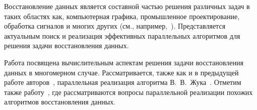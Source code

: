 


Восстановление
данных является составной частью решения различных 
задач в таких областях как, компьютерная графика,
промышленное проектирование,
обработка сигналов и многих других
(см., например,~\cite{book_Kvasov, paper_recv_1, paper_recv_3}).
Представляется актуальным поиск и реализация эффективных параллельных алгоритмов
для решения задачи восстановления данных.

Работа посвящена 
вычислительным аспектам 
решения задачи восстановления данных в многомерном случае. 
Рассматривается, также как и в предыдущей работе авторов~\cite{my_paper_LETI_21},
параллельная реализация
алгоритма
В.~В.~Жука~\cite{book_Zhuk}. %
Отметим также работу~\cite{paper_Mas_recv},
где рассматриваются вопросы параллельной реализации
похожих алгоритмов восстановления данных.


